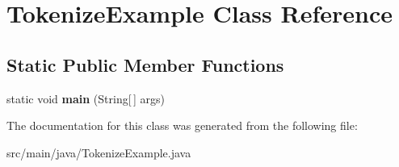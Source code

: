 \hypertarget{classTokenizeExample}{}\section{Tokenize\+Example Class Reference}
\label{classTokenizeExample}
\subsection*{Static Public Member Functions}
\begin{DoxyCompactItemize}
\item 
\mbox{\label{classTokenizeExample_ae3c47f9914570752c4581b666f9429f9}} 
static void {\bfseries main} (String\mbox{[}$\,$\mbox{]} args)
\end{DoxyCompactItemize}


The documentation for this class was generated from the following file\+:\begin{DoxyCompactItemize}
\item 
src/main/java/Tokenize\+Example.\+java\end{DoxyCompactItemize}
